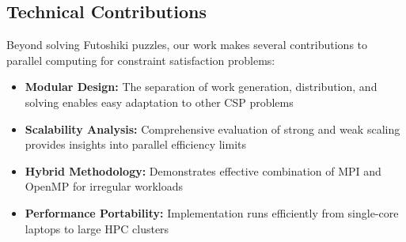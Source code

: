 \subsection{Technical Contributions}
Beyond solving Futoshiki puzzles, our work makes several contributions to parallel computing for constraint satisfaction problems:

\begin{itemize}
    \item \textbf{Modular Design:} The separation of work generation, distribution, and solving enables easy adaptation to other CSP problems
    \item \textbf{Scalability Analysis:} Comprehensive evaluation of strong and weak scaling provides insights into parallel efficiency limits
    \item \textbf{Hybrid Methodology:} Demonstrates effective combination of MPI and OpenMP for irregular workloads
    \item \textbf{Performance Portability:} Implementation runs efficiently from single-core laptops to large HPC clusters
\end{itemize}